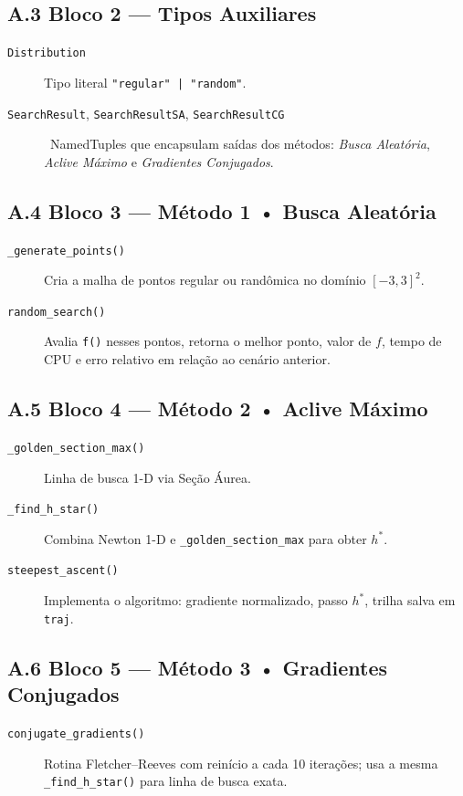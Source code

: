 \documentclass[12pt]{article}
\begin{document}
\subsection*{A.3 Bloco 2 — Tipos Auxiliares}
\begin{description}
  \item[\texttt{Distribution}] Tipo literal \texttt{"regular" | "random"}.
  \item[\texttt{SearchResult}, \texttt{SearchResultSA}, \texttt{SearchResultCG}]%
        \ NamedTuples que encapsulam saídas dos métodos:
        \emph{Busca Aleatória}, \emph{Aclive Máximo} e \emph{Gradientes Conjugados}.
\end{description}

\subsection*{A.4 Bloco 3 — Método 1 • Busca Aleatória}
\begin{description}
  \item[\texttt{\_generate\_points()}] Cria a malha de pontos regular ou
        randômica no domínio $[-3,3]^2$.
  \item[\texttt{random\_search()}] Avalia \texttt{f()} nesses pontos,
        retorna o melhor ponto, valor de $f$, tempo de CPU e erro relativo
        em relação ao cenário anterior.
\end{description}

\subsection*{A.5 Bloco 4 — Método 2 • Aclive Máximo}
\begin{description}
  \item[\texttt{\_golden\_section\_max()}] Linha de busca 1-D via Seção Áurea.
  \item[\texttt{\_find\_h\_star()}] Combina Newton 1-D e
        \texttt{\_golden\_section\_max} para obter $h^\ast$.
  \item[\texttt{steepest\_ascent()}] Implementa o algoritmo:
        gradiente normalizado, passo $h^\ast$, trilha salva em \texttt{traj}.
\end{description}

\subsection*{A.6 Bloco 5 — Método 3 • Gradientes Conjugados}
\begin{description}
  \item[\texttt{conjugate\_gradients()}] Rotina Fletcher–Reeves com reinício
        a cada 10 iterações; usa a mesma \texttt{\_find\_h\_star()} para
        linha de busca exata.
\end{description}
\end{document}
